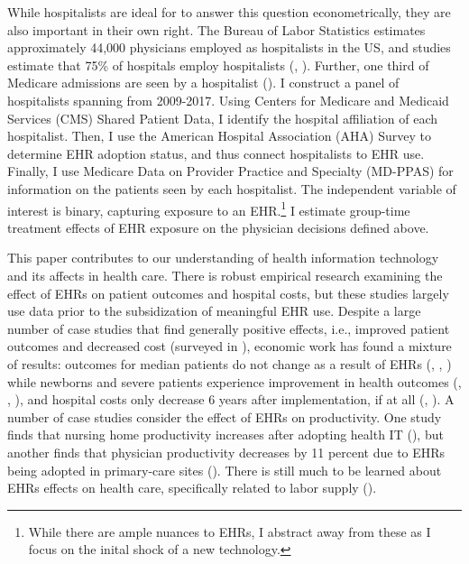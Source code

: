 \documentclass[12pt]{article}
\begin{document}
While hospitalists are ideal for to answer this question econometrically, they are also important in their own right. The Bureau of Labor Statistics estimates approximately 44,000 physicians employed as hospitalists in the US, and studies estimate that 75\% of hospitals employ hospitalists (\cite{bls}, \cite{healthecareers_2022}). Further, one third of Medicare admissions are seen by a hospitalist (\cite{messler2015history}). I construct a panel of hospitalists spanning from 2009-2017. Using Centers for Medicare and Medicaid Services (CMS) Shared Patient Data, I identify the hospital affiliation of each hospitalist. Then, I use the American Hospital Association (AHA) Survey to determine EHR adoption status, and thus connect hospitalists to EHR use. Finally, I use Medicare Data on Provider Practice and Specialty (MD-PPAS) for information on the patients seen by each hospitalist. The independent variable of interest is binary, capturing exposure to an EHR.\footnote{While there are ample nuances to EHRs, I abstract away from these as I focus on the inital shock of a new technology.} I estimate group-time treatment effects of EHR exposure on the physician decisions defined above.

This paper contributes to our understanding of health information technology and its affects in health care. There is robust empirical research examining the effect of EHRs on patient outcomes and hospital costs, but these studies largely use data prior to the subsidization of meaningful EHR use. Despite a large number of case studies that find generally positive effects, i.e., improved patient outcomes and decreased cost (surveyed in \cite{Buntin2011TheResults}), economic work has found a mixture of results: outcomes for median patients do not change as a result of EHRs (\cite{Agha2014TheCare}, \cite{McCullough2016HealthCoordination}, \cite{Meyerhoefer}) while newborns and severe patients experience improvement in health outcomes (\cite{Miller2009}, \cite{Freedman2015}, \cite{McCullough2016HealthCoordination}), and hospital costs only decrease 6 years after implementation, if at all (\cite{Agha2014TheCare}, \cite{dranove2014trillion}). A number of case studies consider the effect of EHRs on productivity. One study finds that nursing home productivity increases after adopting health IT (\cite{Hitt2016}), but another finds that physician productivity decreases by 11 percent due to EHRs being adopted in primary-care sites (\cite{Meyerhoefer}). There is still much to be learned about EHRs effects on health care, specifically related to labor supply (\cite{NBERw29218}). 
\end{document}
